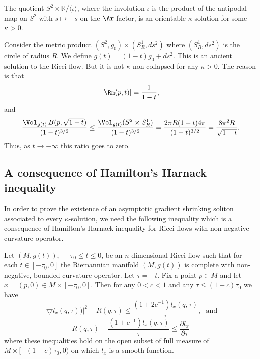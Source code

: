 \smallskip

\begin{example}\label{ex:cylinder-quotient-kappa-solution}
The quotient $S^{2}\times \mathbb{R}/\langle\iota\rangle$, where the
involution $\iota$ is the product of the antipodal map on $S^2$ with
$s\mapsto -s$ on the $\Ar$ factor,  is an orientable
$\kappa$-solution for some $\kappa>0$.
\end{example}

\begin{example}\label{ex:cylinder-with-circle-not-kappa-noncollapsed}
Consider the metric product $(S^{2},g_0) \times (S^{1}_{R},ds^2)$
where $(S^1_R,ds^2)$ is the circle of radius $R$. We define
$g(t)=(1-t)g_0+ds^2$. This is an ancient solution to the Ricci flow.
But it is not $\kappa$-non-collapsed for any $\kappa>0$. The reason
is that
$$|\Rm(p,t)|=\frac{1}{1-t},$$ and
$$\frac{\Vol_{g(t)}\,B(p,\sqrt{1-t})}{(1-t)^{3/2}}
\le \frac{\Vol_{g(t)}(S^{2}\times S^{1}_{R})}{(1-t)^{3/2}}
=\frac{2\pi R(1-t)4\pi}{(1-t)^{3/2}}=\frac{8\pi^2R}{\sqrt{1-t}}.$$
Thus, as $t\rightarrow-\infty$ this ratio goes to zero.
\end{example}



\subsection{A consequence of Hamilton's Harnack inequality}

In order to prove the existence of an asymptotic gradient shrinking
soliton associated to every $\kappa$-solution, we need the following
inequality which is a consequence of Hamilton's Harnack
inequality for Ricci flows
with non-negative curvature operator.

\begin{proposition}\label{prop:harnack-l-function-lipschitz-bound}
\label{uniformlip}
Let $(M,g(t)),\ -\tau_0\le t\le 0$, be an $n$-dimensional Ricci flow
such that for each $t\in [-\tau_0,0]$ the Riemannian manifold
$(M,g(t))$ is complete with non-negative, bounded curvature
operator. Let $\tau=-t$. Fix a point $p\in M$ and let $x=(p,0)\in
M\times [-\tau_0,0]$. Then for any $0<c<1$ and any $\tau\le
(1-c)\tau_0$ we have
$$|\bigtriangledown l_x(q,\tau))|^{2} +R(q,\tau) \leq \frac{(1+2c^{-1})l_x(q,\tau)}{\tau},
\ \ \ \mathrm{and}$$
$$ R(q,\tau)-\frac{(1+c^{-1})l_x(q,\tau)}{\tau}\le
\frac{\partial l_x}{\partial \tau} $$ where these
inequalities hold on the open subset of full measure of $M\times
[-(1-c)\tau_0,0)$ on which $l_x$ is a smooth function.
\end{proposition}

